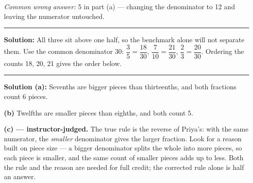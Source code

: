 \documentclass[12pt]{article}
\begin{document}
\emph{Common wrong answer:} 5 in part (a) --- changing the denominator to 12 and leaving the numerator untouched.

\vspace{0.15cm}\noindent\rule{\linewidth}{0.2pt}\vspace{0.15cm}


\textbf{Solution:} All three sit above one half, so the benchmark alone will not separate them. Use the common denominator 30: $\dfrac{3}{5} = \dfrac{18}{30}$, $\dfrac{7}{10} = \dfrac{21}{30}$, $\dfrac{2}{3} = \dfrac{20}{30}$. Ordering the counts 18, 20, 21 gives the order below. 

\vspace{0.15cm}\noindent\rule{\linewidth}{0.2pt}\vspace{0.15cm}


\textbf{Solution (a):} Sevenths are bigger pieces than thirteenths, and both fractions count 6 pieces. 

\textbf{(b)} Twelfths are smaller pieces than eighths, and both count 5. 

\textbf{(c) --- instructor-judged.} The true rule is the reverse of Priya's: with the same numerator, the \emph{smaller} denominator gives the larger fraction. Look for a reason built on piece size --- a bigger denominator splits the whole into more pieces, so each piece is smaller, and the same count of smaller pieces adds up to less. Both the rule and the reason are needed for full credit; the corrected rule alone is half an answer.
\end{document}
